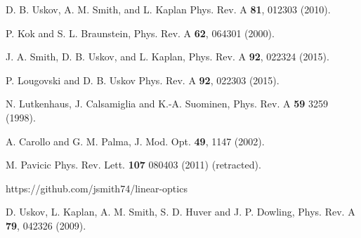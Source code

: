 \documentclass[aps,pra,twocolumn,showpacs,superscriptaddress,floatfix,10pt]{revtex4}
\begin{document}
\begin{thebibliography}{99}
 D. B. Uskov, A. M. Smith, and L. Kaplan
Phys. Rev. A {\bf 81}, 012303 (2010).

 P. Kok and S. L. Braunstein, Phys. Rev. A {\bf 62}, 064301 (2000).

 J. A. Smith, D. B. Uskov, and L. Kaplan, Phys. Rev. A {\bf 92}, 022324 (2015).

 P. Lougovski and D. B. Uskov Phys. Rev. A {\bf 92}, 022303 (2015).

 N. Lutkenhaus, J. Calsamiglia and K.-A. Suominen, Phys. Rev. A {\bf 59} 3259 (1998).

 A. Carollo and G. M. Palma, J. Mod. Opt. {\bf 49}, 1147 (2002).

 M. Pavicic Phys. Rev. Lett. {\bf 107} 080403 (2011) (retracted).

 https://github.com/jsmith74/linear-optics

 D. Uskov, L. Kaplan, A. M. Smith, S. D. Huver and J. P. Dowling, Phys. Rev. A {\bf 79}, 042326 (2009).


\end{thebibliography}
\end{document}
